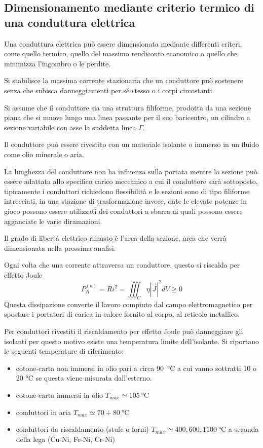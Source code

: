 \subsection{Dimensionamento mediante criterio termico di una conduttura elettrica}
Una conduttura elettrica può essere dimensionata mediante differenti criteri, come 
quello termico, quello del massimo rendiconto economico o quello che minimizza l'ingombro 
o le perdite.

Si stabilisce la massima corrente stazionaria che un conduttore può sostenere
senza che subisca danneggiamenti per sé stesso o i corpi circostanti.

Si assume che il conduttore sia una struttura filiforme, prodotta da una sezione
piana che si muove lungo una linea passante per il suo baricentro, un cilindro a sezione
variabile con asse la suddetta linea $\Gamma$.

Il conduttore può essere rivestito con un materiale isolante o immerso in un fluido come
olio minerale o aria.

La lunghezza del conduttore non ha influenza sulla portata mentre la sezione 
può essere adattata allo specifico carico meccanico a cui il conduttore sarà sottoposto,
tipicamente i conduttori richiedono flessibilità e le sezioni sono di tipo filiforme
intrecciati, in una stazione di trasformazione invece, date le elevate potenze in gioco
possono essere utilizzati dei conduttori a sbarra ai quali possono essere agganciate
le varie diramazioni.

Il grado di libertà elettrico rimasto è l'area della sezione, area che verrà dimensionata
nella prossima analisi.

Ogni volta che una corrente attraversa un conduttore, questo si riscalda per effetto Joule
$$
P_R^{(a)} = Ri^2 = \iiint_C \eta |\vec{J}|^2 dV \geq 0
$$
Questa dissipazione converte il lavoro compiuto dal campo elettromagnetico per
spostare i portatori di carica in calore fornito al corpo, al reticolo metallico.

Per conduttori rivestiti il riscaldamento per effetto Joule può danneggiare gli isolanti
per questo motivo esiste una temperatura limite dell'isolante.
Si riportano le seguenti temperature di riferimento:
\begin{itemize}
\item cotone-carta non immersi in olio
pari a circa \SI{90}{\celsius} a cui vanno sottratti 10 o 20 \si{\celsius} se questa
viene misurata dall'esterno.
\item cotone-carta immersi in olio $T_{max} \simeq \SI{105}{\celsius}$
\item conduttori in aria $T_{max} \simeq 70\div 80\ \si{\celsius}$
\item conduttori da riscaldamento (stufe o forni) $T_{max} \simeq 400,600,1100\ \si{\celsius} $ a seconda della lega (Cu-Ni, Fe-Ni, Cr-Ni) 
\end{itemize}

